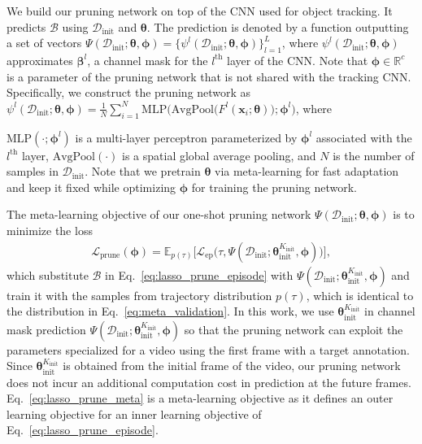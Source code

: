 \documentclass[letterpaper]{article} %
\def \x{\mathbf{x}}
\def \datainit{\mathcal{D}_\text{init}}
\def \phigeneral{\boldsymbol{\phi}}
\def \thetageneral{\boldsymbol{\theta}}
\def \thetainitadapt{\boldsymbol{\theta}_\text{init}}
\def \Kinit{K_\text{init}}
\def \lossepisode{\mathcal{L}_\text{ep}}
\def \lossprune{\mathcal{L}_\text{prune}}
\begin{document}
We build our pruning network on top of the CNN used for object tracking.
It predicts $\mathcal{B}$ using $\datainit$ and $\thetageneral$.
The prediction is denoted by a function outputting a set of vectors $\Psi(\datainit; \thetageneral, \phigeneral) = \{\psi^l(\datainit; \thetageneral,\phigeneral)\}_{l=1}^{L}$, where $\psi^l(\datainit; \thetageneral, \phigeneral)$ approximates $\boldsymbol{\beta}^l$, a channel mask for the $l^\text{th}$ layer of the CNN.
Note that $\phigeneral \in \mathbb{R}^c$ is a parameter of the pruning network that is not shared with the tracking CNN.
Specifically, we construct the pruning network as $\psi^l(\datainit; \thetageneral, \phigeneral) = \frac{1}{N}\sum_{i=1}^{N} \text{MLP}\big(\text{AvgPool}\big(F^l(\x_i; \boldsymbol{\theta})\big);\phigeneral^l\big)$, where

$\text{MLP}(\cdot;\phigeneral^l)$ is a multi-layer perceptron parameterized by $\phigeneral^l$ associated with the $l^\text{th}$ layer, $\text{AvgPool}(\cdot)$ is a spatial global average pooling, and $N$ is the number of samples in $\datainit$.
Note that we pretrain $\boldsymbol{\theta}$ via meta-learning for fast adaptation and keep it fixed while optimizing $\phigeneral$ for training the pruning network.

The meta-learning objective of our one-shot pruning network $\Psi(\datainit;\thetageneral, \phigeneral)$ is to minimize the loss
\begin{align}
\lossprune(\phigeneral) = \mathbb{E}_{p(\tau)} \Big[
	\lossepisode\big(\tau, \Psi(\datainit; \thetainitadapt^{\Kinit}, \phigeneral)\big)
\Big],
\label{eq:lasso_prune_meta}
\end{align}
which substitute $\mathcal{B}$ in Eq.~\eqref{eq:lasso_prune_episode} with $\Psi(\datainit; \thetainitadapt^{\Kinit}, \phigeneral)$ and train it with the samples from trajectory distribution $p(\tau)$, which is identical to the distribution in Eq.~\eqref{eq:meta_validation}.
In this work, we use $\thetainitadapt^{\Kinit}$ in channel mask prediction $\Psi(\datainit; \thetainitadapt^{\Kinit}, \phigeneral)$ so that the pruning network can exploit the parameters specialized for a video using the first frame with a target annotation.
Since $\thetainitadapt^{\Kinit}$ is obtained from the initial frame of the video, our pruning network does not incur an additional computation cost in prediction at the future frames. Eq.~\eqref{eq:lasso_prune_meta} is a meta-learning objective as it defines an outer learning objective for an inner learning objective of Eq.~\eqref{eq:lasso_prune_episode}.
\end{document}
